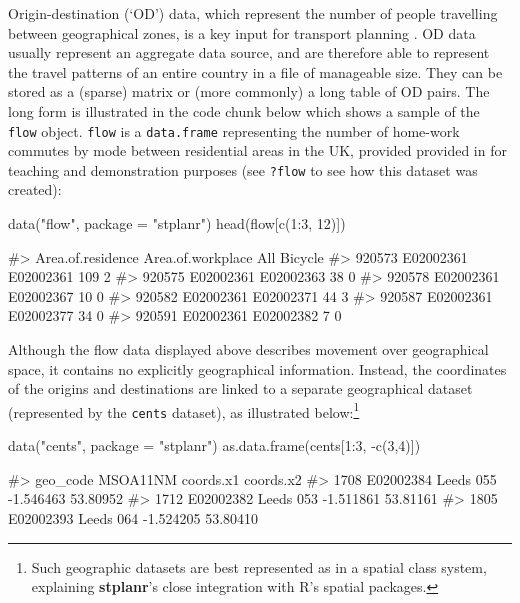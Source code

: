 Origin-destination (`OD') data, which represent the number of people travelling between
geographical zones, is a key input for transport planning \citep{calabrese_estimating_2011}.
OD data usually represent an aggregate data source, and are therefore able to represent the
travel patterns of an entire country in a file of manageable size.
They can be stored as a (sparse) matrix or (more commonly) a long table of OD pairs.
The long form is illustrated in the code chunk below which shows a sample of
the \texttt{flow} object.
\texttt{flow} is a \texttt{data.frame} representing the number
of home-work commutes by mode between residential
areas in the UK, provided provided in 
for teaching and demonstration purposes
(see \texttt{?flow} to see how this dataset was created):

\begin{Schunk}
\begin{Sinput}
data("flow", package = "stplanr")
head(flow[c(1:3, 12)])
\end{Sinput}
\begin{Soutput}
#>        Area.of.residence Area.of.workplace All Bicycle
#> 920573         E02002361         E02002361 109       2
#> 920575         E02002361         E02002363  38       0
#> 920578         E02002361         E02002367  10       0
#> 920582         E02002361         E02002371  44       3
#> 920587         E02002361         E02002377  34       0
#> 920591         E02002361         E02002382   7       0
\end{Soutput}
\end{Schunk}

Although the flow data displayed above describes movement over
geographical space, it contains no explicitly geographical information.
Instead, the coordinates of the origins and destinations are linked to a
separate geographical dataset (represented by the \texttt{cents} dataset),
as illustrated below:\footnote{Such geographic datasets are best represented as in a spatial class system, explaining
\textbf{stplanr}'s close integration with R's spatial packages.}


\begin{Schunk}
\begin{Sinput}
data("cents", package = "stplanr")
as.data.frame(cents[1:3, -c(3,4)])
\end{Sinput}
\begin{Soutput}
#>       geo_code  MSOA11NM coords.x1 coords.x2
#> 1708 E02002384 Leeds 055 -1.546463  53.80952
#> 1712 E02002382 Leeds 053 -1.511861  53.81161
#> 1805 E02002393 Leeds 064 -1.524205  53.80410
\end{Soutput}
\end{Schunk}

